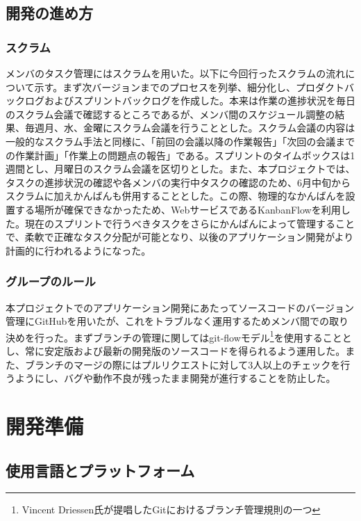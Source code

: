 \documentclass[openany,11pt,papersize]{jsbook}
\begin{document}

\section{開発の進め方}
\subsection{スクラム}
メンバのタスク管理にはスクラムを用いた。以下に今回行ったスクラムの流れについて示す。まず次バージョンまでのプロセスを列挙、細分化し、プロダクトバックログおよびスプリントバックログを作成した。本来は作業の進捗状況を毎日のスクラム会議で確認するところであるが、メンバ間のスケジュール調整の結果、毎週月、水、金曜にスクラム会議を行うこととした。スクラム会議の内容は一般的なスクラム手法と同様に、「前回の会議以降の作業報告」「次回の会議までの作業計画」「作業上の問題点の報告」である。スプリントのタイムボックスは1週間とし、月曜日のスクラム会議を区切りとした。また、本プロジェクトでは、タスクの進捗状況の確認や各メンバの実行中タスクの確認のため、6月中旬からスクラムに加えかんばんも併用することとした。この際、物理的なかんばんを設置する場所が確保できなかったため、WebサービスであるKanbanFlowを利用した。現在のスプリントで行うべきタスクをさらにかんばんによって管理することで、柔軟で正確なタスク分配が可能となり、以後のアプリケーション開発がより計画的に行われるようになった。

\subsection{グループのルール}
本プロジェクトでのアプリケーション開発にあたってソースコードのバージョン管理にGitHubを用いたが、これをトラブルなく運用するためメンバ間での取り決めを行った。まずブランチの管理に関してはgit-flowモデル\footnote{Vincent Driessen氏が提唱したGitにおけるブランチ管理規則の一つ}を使用することとし、常に安定版および最新の開発版のソースコードを得られるよう運用した。また、ブランチのマージの際にはプルリクエストに対して3人以上のチェックを行うようにし、バグや動作不良が残ったまま開発が進行することを防止した。
\chapter{開発準備}

\section{使用言語とプラットフォーム}
\end{document}
